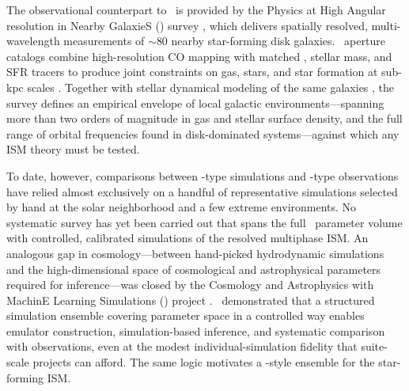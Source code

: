 The observational counterpart to \TIGRESS\ is provided by the Physics at
High Angular resolution in Nearby GalaxieS (\PHANGS) survey
\citep{2021ApJS..255...19L,2023AJ....166..145L}, which delivers
spatially resolved, multi-wavelength measurements of $\sim80$ nearby
star-forming disk galaxies. \PHANGS\ aperture catalogs combine high-resolution
CO mapping with matched \HI, stellar mass, and SFR tracers to produce
joint constraints on gas, stars, and star formation at sub-kpc scales
\citep{2022AJ....164...43S,2023ApJ...945L..19S}.
Together with stellar dynamical modeling of the same galaxies
\citep{2020ApJ...892..148S,2025ApJ...989...66V}, the survey defines an
empirical envelope of local galactic environments---spanning more than two
orders of magnitude in gas and stellar surface density, and the full range
of orbital frequencies found in disk-dominated systems---against which any
ISM theory must be tested.

To date, however, comparisons between \TIGRESS-type simulations and
\PHANGS-type observations have relied almost exclusively on a handful of
representative simulations selected by hand at the solar neighborhood and a
few extreme environments. No systematic survey has yet been carried out
that spans the full \PHANGS\ parameter volume with controlled, calibrated
simulations of the resolved multiphase ISM. An analogous gap in
cosmology---between hand-picked hydrodynamic simulations and the
high-dimensional space of cosmological and astrophysical parameters
required for inference---was closed by the Cosmology and Astrophysics with
MachinE Learning Simulations (\CAMELS) project
\citep{2021ApJ...915...71V}. \CAMELS\ demonstrated that a structured
simulation ensemble covering parameter space in a controlled way enables
emulator construction, simulation-based inference, and systematic
comparison with observations, even at the modest individual-simulation
fidelity that suite-scale projects can afford. The same logic motivates a
\CAMELS-style ensemble for the star-forming ISM.

